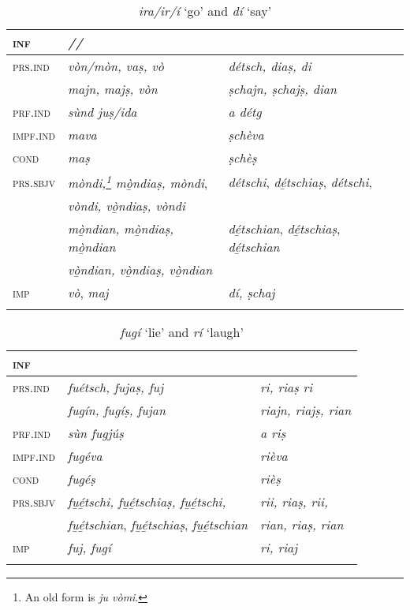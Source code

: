 \begin{table}
	\caption{\textit{ira/ir/í} `go' and \textit{dí} `say'}

	\begin{tabular}{llll}
		\lsptoprule
		\textsc{inf} & \textbf{\textit{\isi{ira}/\isi{ir}/\isi{í}}} & \isi{\textbf{\textit{dí}}}\\
		\midrule
		\textsc{prs.ind} & \textit{vòn/mòn, vaṣ, vò} & \textit{détsch, diaṣ, di} \\
		& \textit{majn, majṣ, vòn} & \textit{ṣchajn, ṣchajṣ, dian}\\
		\textsc{prf.ind} & \textit{sùnd juṣ/ida} & \textit{a détg}\\
		\textsc{impf.ind} & \textit{mava} & \textit{ṣchèva}\\
		\textsc{cond} & \textit{maṣ} & \textit{ṣchèṣ}\\
		\textsc{prs.sbjv} & \textit{mòndi,\footnote{An old form is \textit{ju vòmi}.} mò̱ndiaṣ, mòndi}, & \textit{détschi}, \textit{dé̱tschiaṣ}, \textit{détschi},\\
&	\textit{vòndi, vò̱ndiaṣ, vòndi}\\
		& \textit{mò̱ndian, mò̱ndiaṣ, mò̱ndian} & \textit{dé̱tschian}, \textit{dé̱tschiaṣ}, \textit{dé̱tschian} \\
	&	\textit{vò̱ndian, vò̱ndiaṣ, vò̱ndian}\\
		\textsc{imp} & \textit{vò}, \textit{maj} & \textit{dí, ṣchaj}\\
		\lspbottomrule
	\end{tabular}
\end{table}

\clearpage

\begin{table}
\small
	\caption{\textit{fugí} `lie' and \textit{rí} `laugh'}
\label{tab:fugi}
	\begin{tabular}{lll}
		\lsptoprule
		\textsc{inf} & \isi{\textbf{\textit{fugí}}} & \isi{\textbf{\textit{rí}}}\\
		\midrule
		\textsc{prs.ind} & \textit{fuétsch, fujaṣ, fuj} & \textit{ri, riaṣ ri}\\
		&  \textit{fugín, fugíṣ, fujan} & \textit{riajn, riajṣ, rian}\\
		\textsc{prf.ind} & \textit{sùn fugjúṣ} & \textit{a riṣ}\\
		\textsc{impf.ind} & \textit{fugéva} & \textit{rièva}\\
		\textsc{cond} & \textit{fugéṣ} & \textit{rièṣ}\\
		\textsc{prs.sbjv} & \textit{fu̱é̱tschi, fu̱é̱tschiaṣ, fu̱é̱tschi,} & \textit{rii, riaṣ, rii,}\\
		& \textit{fu̱é̱tschian}, \textit{fu̱é̱tschiaṣ}, \textit{fu̱é̱tschian} & \textit{rian, riaṣ, rian}\\
		\textsc{imp} & \textit{fuj, fugí} & \textit{ri, riaj}\\
		\lspbottomrule
	\end{tabular}
\end{table}



